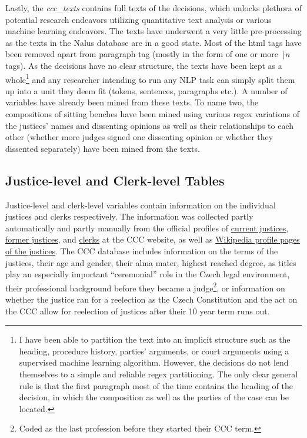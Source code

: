 \documentclass[
  11pt,
]{article}
\begin{document}
Lastly, the \emph{ccc\_texts} contains full texts of the decisions, which unlocks plethora of potential research endeavors utilizing quantitative text analysis or various machine learning endeavors. The texts have underwent a very little pre-processing as the texts in the Nalus database are in a good state. Most of the html tags have been removed apart from paragraph tag (mostly in the form of one or more \emph{\textbackslash n} tags). As the decisions have no clear structure, the texts have been kept as a whole\footnote{I have been able to partition the text into an implicit structure such as the heading, procedure history, parties' arguments, or court arguments using a supervised machine learning algorithm. However, the decisions do not lend themselves to a simple and reliable regex partitioning. The only clear general rule is that the first paragraph most of the time contains the heading of the decision, in which the composition as well as the parties of the case can be located.} and any researcher intending to run any NLP task can simply split them up into a unit they deem fit (tokens, sentences, paragraphs etc.). A number of variables have already been mined from these texts. To name two, the compositions of sitting benches have been mined using various regex variations of the justices' names and dissenting opinions as well as their relationships to each other (whether more judges signed one dissenting opinion or whether they dissented separately) have been mined from the texts.

\subsection{Justice-level and Clerk-level Tables}\label{justice-level-and-clerk-level-tables}

Justice-level and clerk-level variables contain information on the individual justices and clerks respectively. The information was collected partly automatically and partly manually from the official profiles of \href{https://www.usoud.cz/soucasni-funkcionari-a-soudci}{current justices}, \href{https://www.usoud.cz/emeritni-funkcionari-a-soudci}{former justices}, and \href{https://www.usoud.cz/asistenti-soudcu}{clerks} at the CCC website, as well as \href{https://cs.wikipedia.org/wiki/Seznam_soudců_Ústavního_soudu_České_republiky}{Wikipedia profile pages of the justices}. The CCC database includes information on the terms of the justices, their age and gender, their alma mater, highest reached degree, as titles play an especially important ``ceremonial'' role in the Czech legal environment, their professional background before they became a judge\footnote{Coded as the last profession before they started their CCC term.}, or information on whether the justice ran for a reelection as the Czech Constitution and the act on the CCC allow for reelection of justices after their 10 year term runs out.
\end{document}
